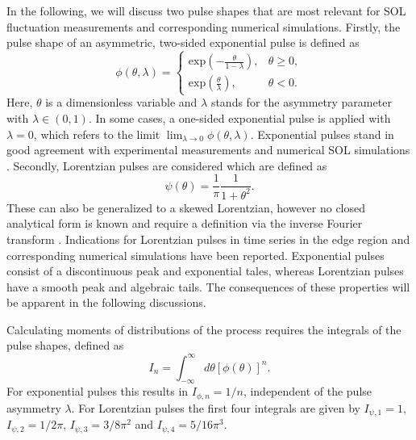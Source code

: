 In the following, we will discuss two pulse shapes that are most relevant for SOL fluctuation measurements and corresponding numerical simulations. Firstly, the pulse shape of an asymmetric, two-sided exponential pulse is defined as 
\begin{equation}
	\phi(\theta,\lambda) = \begin{cases} \mathrm{exp}\left(-\frac{\theta}{1-\lambda}\right), &\theta \geq 0,\\
		\mathrm{exp}\left(\frac{\theta}{\lambda}\right), &\theta < 0.
	\end{cases}
\end{equation}
Here, $\theta$ is a dimensionless variable and $\lambda$ stands for the asymmetry parameter with $\lambda \in (0,1)$. In some cases, a one-sided exponential pulse is applied with $\lambda = 0$, which refers to the limit $\lim_{\lambda\to 0} \phi(\theta,\lambda)$. Exponential pulses stand in good agreement with experimental measurements \cite{antar2003universality,boedo2005edge,garcia2007fluctuations,garcia2007collisionality,garcia2013intermittent,garcia2015intermittent,garcia2017sol,kube2018intermittent,garcia2018intermittent} and numerical SOL simulations \cite{garcia2007fluctuations,decristoforo2021numerical}.  Secondly, Lorentzian pulses are considered which are defined as 
\begin{equation}
	\psi(\theta) = \frac{1}{\pi}\frac{1}{1+\theta^2}. 
\end{equation}
These can also be generalized to a skewed Lorentzian, however no closed analytical form is known and require a definition via the inverse Fourier transform \cite{garcia2018skewed}. Indications for Lorentzian pulses in time series in the edge region \cite{maggs2011generality,van2012relevance,maggs2015chaotic,zhu2017chaotic} and corresponding numerical simulations \cite{decristoforo2020intermittent} have been reported. Exponential pulses consist of a discontinuous peak and exponential tales, whereas Lorentzian pulses have a smooth peak and algebraic tails. The consequences of these properties will be apparent in the following discussions. 

Calculating moments of distributions of the process requires the integrals of the pulse shapes, defined as
\begin{equation}
	I_n = \int_{-\infty}^{\infty} d\theta [\phi(\theta)]^n. 
\end{equation}
For exponential pulses this results in $I_{\phi,n} = 1/n$, independent of the pulse asymmetry $\lambda$. For Lorentzian pulses the first four integrals are given by $I_{\psi,1} = 1$, $I_{\psi,2} = 1/2\pi$, $I_{\psi,3} = 3/8\pi^2$ and $I_{\psi,4} = 5/16\pi^3$. 

